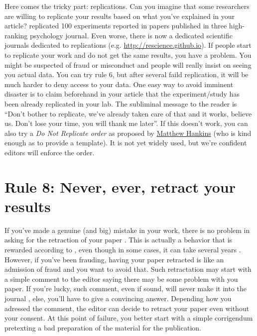 \documentclass[a4paper,10pt,onecolumn]{article}
\begin{document}
Here comes the tricky part: replications. Can you imagine that some researchers
are willing to replicate your results based on what you've explained in your
article? \citep{nosek:2015} replicated 100 experiments reported in papers
published in three high-ranking psychology journal. Even worse, there is now a
dedicated scientific journals dedicated to replications
(e.g. \url{http://rescience.github.io}). If people start to replicate your work
and do not get the same results, you have a problem. You might be suspected of
fraud or misconduct and people will really insist on seeing you actual
data. You can try rule 6, but after several faild replication, it will be much
harder to deny access to your data. One easy way to avoid imminent disaster is
to claim beforehand in your article that the experiment/study has been already
replicated in your lab. The subliminal message to the reader is ``Don't bother
to replicate, we've already taken care of that and it works, believe us. Don't
lose your time, you will thank me later''. If this doesn't work, you can also
try a {\em Do Not Replicate order} as proposed by
\href{https://mchankins.wordpress.com/2014/07/12/do-not-replicate/}{Matthew
  Hankins} (who is kind enough as to provide a template). It is not yet widely
used, but we're confident editors will enforce the order.

\section*{Rule 8: Never, ever, retract your results}

If you've made a genuine (and big) mistake in your work, there is no problem in
asking for the retraction of your paper \citep{miller:2006}. This is actually
a behavior that is rewarded according to \citep{lu:2013}, even though in some
cases, it can take several years \citep{trivers:2009}. However, if you've been
frauding, having your paper retracted is like an admission of fraud and you
want to avoid that. Such retractation may start with a simple comment to the
editor saying there may be some problem with you paper. If you're lucky, such
comment, even if sound, will never make it into the journal
\citep{trebino:2009}, else, you'll have to give a convincing answer. Depending
how you adressed the comment, the editor can decide to retract your paper even
without your consent.  At this point of failure, you better start with a simple
corrigendum pretexting a bad preparation of the material for the publication.
\end{document}
